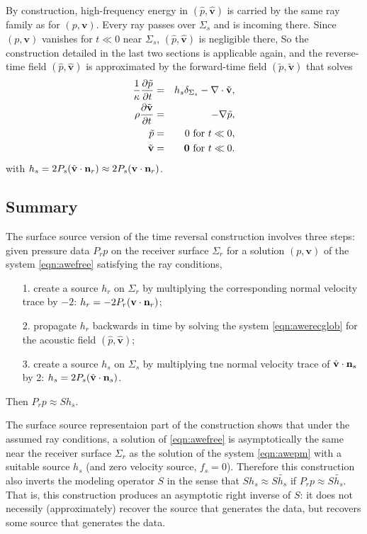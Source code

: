 \documentclass[georeport,12pt]{geophysics}
\newcommand{\bv}{\mathbf{v}}
\begin{document}
By construction, high-frequency energy in $(\hat{p},\hat{\bv})$ is
carried by the same ray family as for $(p,\bv)$. Every ray passes over
$\Sigma_s$ and is incoming there. Since $(p,\bv)$ vanishes for $t \ll
0$ near $\Sigma_s$, $(\hat{p},\hat{\bv})$ is negligible there,  So
the construction detailed in the last two sections is applicable
again, and the reverse-time field $(\hat{p},\hat{\bv})$ is
approximated by the forward-time field $(\tilde{p},\tilde{\bv})$ that solves
\begin{eqnarray}
\label{eqn:awesrcglob}
  \frac{1}{\kappa}\frac{\partial\tilde{p}}{\partial t} & = & h_s \delta_{\Sigma_s}
                                                      - \nabla \cdot \tilde{\bv}, \nonumber \\
  \rho\frac{\partial \tilde{\bv}}{\partial t} & = & - \nabla \tilde{p}, \nonumber \\
  \tilde{p} & = & 0 \mbox{ for } t\ll 0, \nonumber \\
  \tilde{\bv} & = & {\bf 0} \mbox{ for } t \ll 0.       
\end{eqnarray}
with $h_s = 2P_s(\hat{\bv} \cdot {\bf n}_r) \approx 2P_s(\bv \cdot
{\bf n}_r)$.

\subsection{Summary}
The surface source version of the time reversal construction involves three steps: given
pressure data $P_rp$ on the receiver surface $\Sigma_r$ for a solution
$(p,\bv)$ of the system \ref{eqn:awefree} satisfying the ray conditions,
\begin{itemize}
\item[1. ] create a source $h_r$ on $\Sigma_r$
  by multiplying the corresponding normal velocity trace by $-2$: $h_r = -2P_r(\bv
  \cdot {\bf n}_r)$;
\item[2. ] propagate $h_r$ backwards in time by solving the system
  \ref{eqn:awerecglob} for the acoustic field $(\hat{p},\hat{\bv})$;
\item[3. ] create a source $h_s$ on $\Sigma_s$ by  multiplying tne
  normal velocity trace of $\hat{\bv}\cdot {\bf n}_s$ by 2: $h_s = 2P_s(\hat{\bv}
  \cdot {\bf n}_s)$.
\end{itemize}
Then $P_r p \approx Sh_s$.

The surface source representaion part of the construction shows that
under the assumed ray conditions, a solution of \ref{eqn:awefree} is
asymptotically the same near the receiver surface $\Sigma_r$ as the
solution of the system \ref{eqn:awepm} with a suitable source
$h_s$ (and zero velocity source, $f_s=0$). Therefore this
construction also inverts the modeling operator $S$ in the sense that
$Sh_s\approx S\tilde{h_s}$ if $P_rp \approx S\tilde{h_s}$. That is,
this construction produces an asymptotic right inverse of $S$: it
does not necessily (approximately) recover the source that generates
the data, but recovers some source that generates the data.
\end{document}
